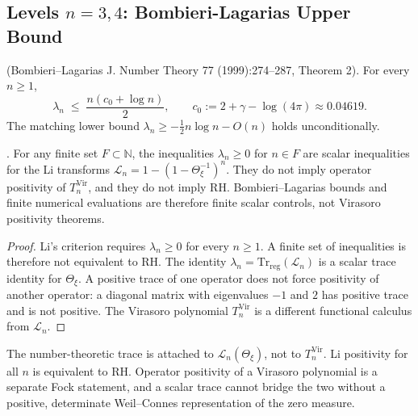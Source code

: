 \subsection{Levels \(n=3,4\): Bombieri-Lagarias Upper Bound}
\label{v4-arith:vb:n=3-4}

\begin{theorem}
\label{v4-arith:vb:thm:BL-bound}
\ClaimStatusProvedElsewhere (Bombieri--Lagarias J. Number Theory
77 (1999):274--287, Theorem 2). For every \(n\geq 1\),
\begin{equation}
\label{v4-arith:vb:eq:BL-bound}
\lambda_{n}\;\leq\;\frac{n(c_{0}+\log n)}{2},
\qquad c_{0}:=2+\gamma-\log(4\pi)\approx 0.04619.
\end{equation}
The matching lower bound \(\lambda_{n}\geq -\tfrac{1}{2}n\log n-O(n)\)
holds unconditionally.
\end{theorem}

\begin{corollary}
\label{v4-arith:vb:cor:n=3-4-trace}
\ClaimStatusProvedHere. For any finite set \(F\subset\mathbb N\), the
inequalities \(\lambda_{n}\geq0\) for \(n\in F\) are scalar
inequalities for the Li transforms
\(\mathcal L_{n}=1-(1-\Theta_{\xi}^{-1})^{n}\). They do not imply
operator positivity of \(T_{n}^{\mathrm{Vir}}\), and they do not
imply RH. Bombieri--Lagarias bounds and finite numerical evaluations
are therefore finite scalar controls, not Virasoro positivity
theorems.
\end{corollary}

\begin{proof}
Li's criterion requires \(\lambda_{n}\geq0\) for every \(n\geq1\).
A finite set of inequalities is therefore not equivalent to RH. The
identity \(\lambda_{n}=\mathrm{Tr}_{\mathrm{reg}}(\mathcal L_{n})\) is
a scalar trace identity for \(\Theta_{\xi}\). A positive trace of one operator
does not force positivity of another operator: a diagonal matrix with
eigenvalues \(-1\) and \(2\) has positive trace and is not positive.
The Virasoro polynomial \(T_{n}^{\mathrm{Vir}}\) is a different
functional calculus from \(\mathcal L_{n}\).
\end{proof}

\begin{remark}
\label{v4-arith:vb:rem:trace-gap}
The number-theoretic trace is attached to
\(\mathcal L_{n}(\Theta_{\xi})\), not to \(T_{n}^{\mathrm{Vir}}\).
Li positivity for all \(n\) is equivalent to RH. Operator positivity
of a Virasoro polynomial is a separate Fock statement, and a scalar
trace cannot bridge the two without a positive, determinate
Weil--Connes representation of the zero measure.
\end{remark}

